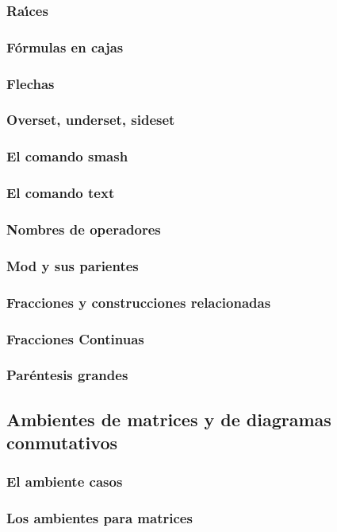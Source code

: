 \documentclass [spanish,12pt]{article}
\begin{document}
\subsubsection{Ra\'{\i}ces}

\subsubsection{F\'ormulas en cajas}

\subsubsection{Flechas}

\subsubsection{Overset, underset, sideset}

\subsubsection{El comando smash}

\subsubsection{El comando text}

\subsubsection{Nombres de operadores}

\subsubsection{Mod y sus parientes}

\subsubsection{Fracciones y construcciones relacionadas}

\subsubsection{Fracciones Continuas}

\subsubsection{Par\'entesis grandes}

\subsection{Ambientes de matrices y de diagramas conmutativos} 

\subsubsection{El ambiente casos}

\subsubsection{Los ambientes para matrices}
\end{document}
